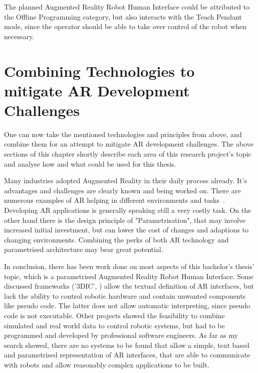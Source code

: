 The planned Augmented Reality Robot Human Interface could be attributed to the Offline Programming category, but also interacts with the Teach Pendant mode, since the operator should be able to take over control of the robot when necessary.

\section{Combining Technologies to mitigate AR Development Challenges}

One can now take the mentioned technologies and principles from above, and combine them for an attempt to mitigate AR development challenges. The above sections of this chapter shortly describe each area of this research project's topic and analyse how and what could be used for this thesis.

Many industries adopted Augmented Reality in their daily process already. It's advantages and challenges are clearly known and being worked on. There are numerous examples of AR helping in different environments and tasks~\cite{DiegmannBenefitsAREdu, SalaminBenefitsAR, ARInMilRepair}. Developing AR applications is generally speaking still a very costly task. On the other hand there is the design principle of "Parametrisation", that may involve increased initial investment, but can lower the cost of changes and adaptions to changing environments. Combining the perks of both AR technology and parametrised architecture may bear great potential.

In conclusion, there has been work done on most aspects of this bachelor's thesis' topic, which is a parametrised Augmented Reality Robot Human Interface. Some discussed frameworks ('3DIC', \cite{figueroa2006conceptual}) allow the textual definition of AR interfaces, but lack the ability to control robotic hardware and contain unwanted components like pseudo code. The latter does not allow automatic interpreting, since pseudo code is not executable. Other projects showed the feasibility to combine simulated and real world data to control robotic systems, but had to be programmed and developed by professional software engineers. As far as my search showed, there are no systems to be found that allow a simple, text based and parametrised representation of AR interfaces, that are able to communicate with robots and allow reasonably complex applications to be built.













